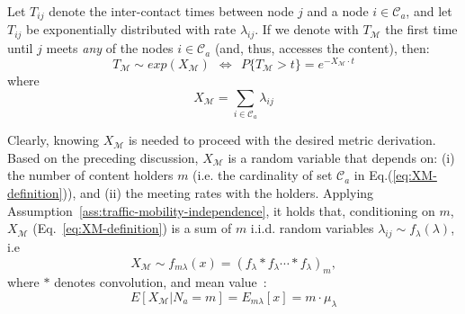 \documentclass[journal]{IEEEtran}
\newcommand{\eq}[1]{Eq.~\eqref{#1}}
\newcommand{\XM}{{X}_{\mathcal{M}}}
\begin{document}
Let $T_{ij}$ denote the inter-contact times between node $j$ and a node $i\in\mathcal{C}_{a}$, and let  $T_{ij}$ be exponentially distributed with rate $\lambda_{ij}$. If we denote with $T_{\mathcal{M}}$ the first time until $j$ meets \textit{any} of the nodes $i\in\mathcal{C}_{a}$ (and, thus, accesses the content), then: 
\begin{equation}
T_{\mathcal{M}} \sim exp\left(\XM\right)~~\Leftrightarrow~~P\lbrace T_{\mathcal{M}}>t\rbrace  = e^{-\XM \cdot t}
\end{equation}
where
\begin{equation}\label{eq:XM-definition}
\XM = \sum_{i\in\mathcal{C}_{a}}\lambda_{ij}
\end{equation}

Clearly, knowing $\XM$ is needed to proceed with the desired metric derivation. Based on the preceding discussion, $\XM$ is a random variable that depends on: (i) the number of content holders $m$ (i.e. the cardinality of set $\mathcal{C}_{a}$ in Eq.(\ref{eq:XM-definition})), and (ii) the meeting rates with the holders. Applying Assumption~\ref{ass:traffic-mobility-independence}, it holds that, conditioning on $m$, $\XM$ (\eq{eq:XM-definition}) is a sum of $m$ i.i.d. random variables $\lambda_{ij}\sim f_{\lambda}(\lambda)$, i.e
\begin{equation}\label{eq:definition-fml}
\XM\sim f_{m\lambda}(x) = \left(f_{\lambda}\ast f_{\lambda} \cdots \ast f_{\lambda} \right)_{m},
\end{equation}
where $\ast$ denotes convolution, and mean value~\cite{RossProbModels}:
\begin{equation}\label{eq:mean-ml-x}
E[\XM|N_{a}=m] = E_{m\lambda}[x] =m\cdot \mu_{\lambda}
\end{equation}
\end{document}

